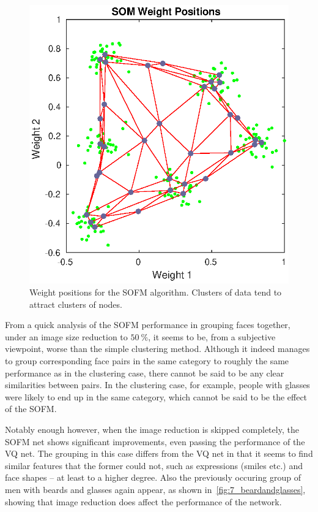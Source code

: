 \documentclass[a4paper,12pt]{article}
\theoremstyle{plain}
\theoremstyle{definition}
\begin{document}
      \begin{figure}[H]
         \centering
         \includegraphics[scale=.6]{6}
         \caption{Weight positions for the SOFM algorithm. Clusters of data tend
         to attract clusters of nodes.}
         \label{fig:6}
      \end{figure}

      From a quick analysis of the SOFM performance in grouping faces together,
      under an image size reduction to $50~\%$,
      it seems to be, from a subjective viewpoint, worse than the simple clustering
      method. Although it indeed manages to group corresponding face pairs in
      the same category to roughly the same performance as in the clustering
      case, there cannot be said to be any clear similarities between pairs. In
      the clustering case, for example, people with glasses were likely to end
      up in the same category, which cannot be said to be the effect of the SOFM. 

      Notably enough however, when the image reduction is skipped completely,
      the SOFM net shows significant improvements, even passing the performance
      of the VQ net. The grouping in this case differs from the VQ net in that
      it seems to find similar features that the former could not, such as
      expressions (smiles etc.) and face shapes -- at least to a higher degree.
      Also the previously occuring group of men with beards and glasses again
      appear, as shown in~\cref{fig:7_beardandglasses}, showing that image
      reduction does affect the performance of the network.
      
\end{document}
